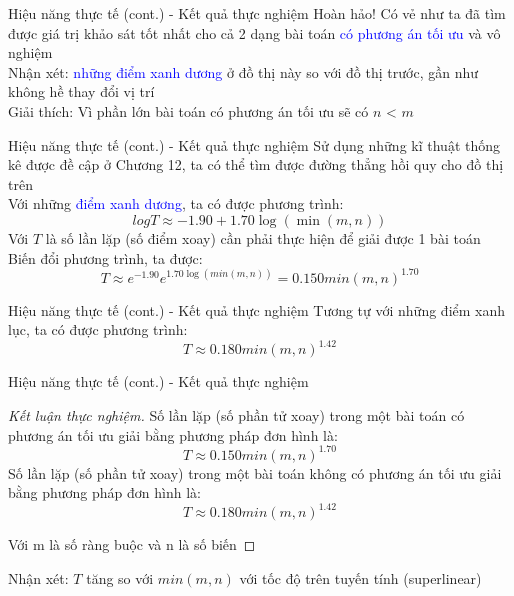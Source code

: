 \documentclass[10pt]{beamer}
\begin{document}
\begin{frame}[fragile]{Hiệu năng thực tế (cont.) - Kết quả thực nghiệm}
Hoàn hảo! Có vẻ như ta đã tìm được giá trị khảo sát tốt nhất cho cả 2 dạng bài toán \textcolor{blue}{có phương án tối ưu} và \textcolor{codegreen}{vô nghiệm}\\
Nhận xét: \textcolor{blue}{những điểm xanh dương} ở đồ thị này so với đồ thị trước, gần như không hề thay đổi vị trí\\
Giải thích: Vì phần lớn bài toán có phương án tối ưu sẽ có $n$ < $m$
\end{frame}

\begin{frame}[fragile]{Hiệu năng thực tế (cont.) - Kết quả thực nghiệm}
Sử dụng những kĩ thuật thống kê được đề cập ở Chương 12, ta có thể tìm được đường thẳng hồi quy cho đồ thị trên\\
Với những \textcolor{blue}{điểm xanh dương}, ta có được phương trình:
$$
log T \approx -1.90 + 1.70\log(\min(m, n))
$$
Với $T$ là số lần lặp (số điểm xoay) cần phải thực hiện để giải được 1 bài toán\\
Biến đổi phương trình, ta được:
$$
T \approx e^{-1.90}e^{1.70\log(min(m, n))} = 0.150min(m, n)^{1.70}
$$
\end{frame}

\begin{frame}[fragile]{Hiệu năng thực tế (cont.) - Kết quả thực nghiệm}
Tương tự với những \textcolor{codegreen}{điểm xanh lục}, ta có được phương trình:
$$
T \approx 0.180min(m, n)^{1.42}
$$
\end{frame}

\begin{frame}{Hiệu năng thực tế (cont.) - Kết quả thực nghiệm}
\begin{proof}[Kết luận thực nghiệm]
Số lần lặp (số phần tử xoay) trong một bài toán có phương án tối ưu  giải bằng phương pháp đơn hình là:
$$
\displaystyle
T \approx 0.150min(m, n)^{1.70}
$$
Số lần lặp (số phần tử xoay) trong một bài toán không có phương án tối ưu giải bằng phương pháp đơn hình là:
$$
\displaystyle
T \approx 0.180min(m, n)^{1.42}
$$
 
Với m là số ràng buộc và n là số biến
\end{proof}

Nhận xét: $T$ tăng so với $min(m, n)$ với tốc độ trên tuyến tính (superlinear)

\end{frame}
\end{document}
